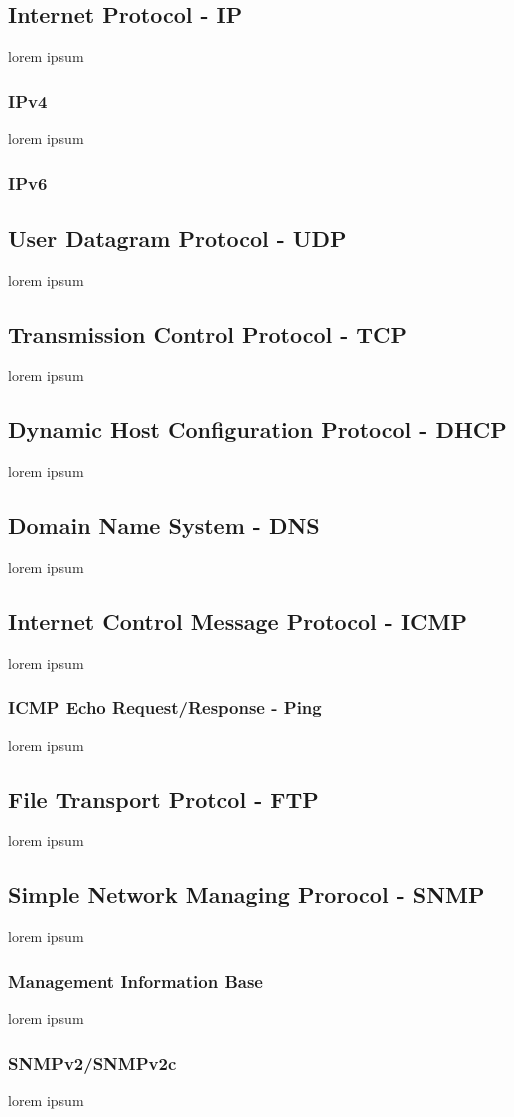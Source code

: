 \documentclass[11pt,a4paper]{report}
\begin{document}
\subsection{Internet Protocol - IP}\label{ssec:ip}
lorem ipsum
\subsubsection{IPv4}
lorem ipsum
\subsubsection{IPv6}
\subsection{User Datagram Protocol - UDP}
lorem ipsum
\subsection{Transmission Control Protocol - TCP}
lorem ipsum
\subsection{Dynamic Host Configuration Protocol - DHCP}
lorem ipsum
\subsection{Domain Name System - DNS}
lorem ipsum
\subsection{Internet Control Message Protocol - ICMP}
lorem ipsum 
\subsubsection{ICMP Echo Request/Response - Ping}
lorem ipsum
\subsection{File Transport Protcol - FTP}
lorem ipsum
\subsection{Simple Network Managing Prorocol - SNMP}
lorem ipsum
\subsubsection{Management Information Base}
lorem ipsum
\subsubsection{SNMPv2/SNMPv2c}
lorem ipsum
\end{document}
